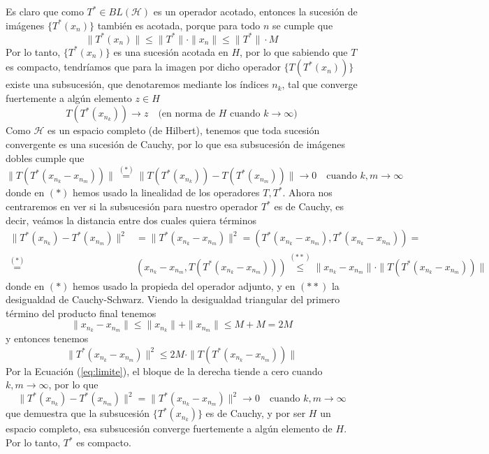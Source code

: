 \begin{ejercicio}
\begin{description}
        \noindent
        Es claro que como $T^*\in BL(\mathcal{H})$ es un operador acotado, entonces la sucesión de imágenes $\{T^*(x_n)\}$ también es acotada, porque para todo $n$ se cumple que
        $$\|T^*(x_n)\| \le \|T^*\| \cdot \|x_n\| \le \|T^*\| \cdot M$$
        Por lo tanto, $\{T^*(x_n)\}$ es una sucesión acotada en $H$, por lo que sabiendo que $T$ es compacto, tendríamos que para la imagen por dicho operador $\{T(T^*(x_n))\}$ existe una subsucesión, que denotaremos mediante los índices $n_k$, tal que converge fuertemente a algún elemento $z \in H$
        $$T(T^*(x_{n_k})) \longrightarrow z \quad \text{(en norma de } H \text{ cuando } k \to \infty)$$
        Como $\mathcal{H}$ es un espacio completo (de Hilbert), tenemos que toda sucesión convergente es una sucesión de Cauchy, por lo que esa subsucesión de imágenes dobles cumple que
        \begin{equation}\label{eq:limite}
            \|T(T^*(x_{n_k} - x_{n_m}))\|\overset{(*)}{=}\|T(T^*(x_{n_k})) - T(T^*(x_{n_m}))\|  \longrightarrow 0 \quad \text{cuando } k, m \to \infty
        \end{equation}
        donde en $(*)$ hemos usado la linealidad de los operadores $T, T^*$. Ahora nos centraremos en ver si la subsucesión para nuestro operador $T^*$ es de Cauchy, es decir, veámos la distancia entre dos cuales quiera términos
        \begin{align*}
            \|T^*(x_{n_k}) - T^*(x_{n_m})\|^2 &= \|T^*(x_{n_k} - x_{n_m})\|^2=( T^*(x_{n_k} - x_{n_m}), T^*(x_{n_k} - x_{n_m}) ) = \\
            \overset{(*)}{=}& ( x_{n_k} - x_{n_m}, T(T^*(x_{n_k} - x_{n_m})) ) \overset{(**)}{\le} \|x_{n_k} - x_{n_m}\| \cdot \|T(T^*(x_{n_k} - x_{n_m}))\|
        \end{align*}
        donde en $(*)$ hemos usado la propieda del operador adjunto, y en $(**)$ la desigualdad de Cauchy-Schwarz. Viendo la desigualdad triangular del primero término del producto final tenemos
        \begin{equation*}
            \|x_{n_k} - x_{n_m}\| \le \|x_{n_k}\| + \|x_{n_m}\| \le M + M = 2M
        \end{equation*}
        y entonces tenemos
        $$\|T^*(x_{n_k} - x_{n_m})\|^2 \le 2M \cdot \|T(T^*(x_{n_k} - x_{n_m}))\|$$
        Por la Ecuación (\ref{eq:limite}), el bloque de la derecha tiende a cero cuando $k, m \to \infty$, por lo que
        $$\|T^*(x_{n_k}) - T^*(x_{n_m})\|^2=\|T^*(x_{n_k} - x_{n_m})\|^2 \longrightarrow 0 \quad \text{cuando } k, m \to \infty$$
        que demuestra que la subsucesión $\{T^*(x_{n_k})\}$ es de Cauchy, y por ser $H$ un espacio completo, esa subsucesión converge fuertemente a algún elemento de $H$. Por lo tanto, $T^*$ es compacto.
    \end{description}
\end{ejercicio}

